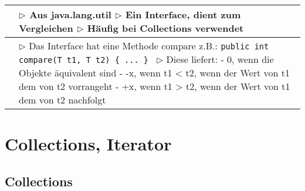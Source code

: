 	\begin{table}[H]
	\label{Comparator}
	\begin{tabular}{ | p{4cm} p{13.5cm} | }
	

	\hline
	\makecell[l]{Nutzen} & 
	\makecell[l]
	{
	$\rhd$ Aus java.lang.util \\
	$\rhd$ Ein Interface, dient zum Vergleichen \\
	$\rhd$ Häufig bei Collections verwendet \\
	} 	\\ \hline


	\makecell[l]{Funktion} & 
	\makecell[l]
	{
	$\rhd$ Das Interface hat eine Methode compare \\
	\hspace{0.4cm}z.B.: \texttt{public int compare(T t1, T t2) \{ ... \} } \\
	$\rhd$ Diese liefert: \\
	\hspace{0.4cm} - 0, wenn die Objekte äquivalent sind \\
	\hspace{0.4cm} - -x, wenn t1 < t2, wenn der Wert von t1 dem von t2 vorrangeht \\
	\hspace{0.4cm} - +x, wenn t1 > t2, wenn der Wert von t1 dem von t2 nachfolgt \\
	} 	\\ \hline


	\end{tabular}
	\end{table}



\section{Collections, Iterator}

\subsection{Collections}


